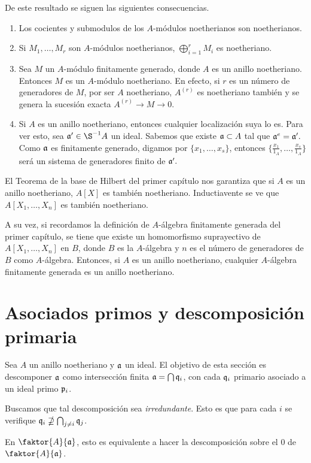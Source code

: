 \documentclass[../main.tex]{subfiles}
\begin{document}
\begin{remark}
De este resultado se siguen las siguientes consecuencias.\begin{enumerate}
    \item Los cocientes y submodulos de los $A$-módulos noetherianos son noetherianos.
    \item Si $M_1,\dots,M_r$ son $A$-módulos noetherianos, $\bigoplus_{i=1}^rM_i$ es noetheriano.
    \item Sea $M$ un $A$-módulo finitamente generado, donde $A$ es un anillo noetheriano. Entonces $M$ es un $A$-módulo noetheriano. En efecto, si $r$ es un número de generadores de $M$, por ser $A$ noetheriano, $A^{(r)}$ es noetheriano también y se genera la sucesión exacta $A^{(r)}\rightarrow M\rightarrow 0$.
    \item Si $A$ es un anillo noetheriano, entonces cualquier localización suya lo es. Para ver esto, sea $\af'\in\S^{-1}A$ un ideal. Sabemos que existe $\mathfrak{a}\subset A$ tal que $\mathfrak{a}^e=\mathfrak{a}'.$ Como $\mathfrak{a}$ es finitamente generado, digamos por $\{x_1,\dots,x_s\}$, entonces $\{\frac{x_1}{1_A},\dots,\frac{x_s}{1_A}\}$ será un sistema de generadores finito de $\mathfrak{a}'.$
\end{enumerate}
\end{remark}
El Teorema de la base de Hilbert del primer capítulo nos garantiza que si $A$ es un anillo noetheriano, $A[X]$ es también noetheriano. Inductiavente se ve que $A[X_1,\dots,X_n]$ es también noetheriano.

A su vez, si recordamos la definición de $A$-álgebra finitamente generada del primer capítulo, se tiene que existe un homomorfismo suprayectivo de $A[X_1,\dots,X_n]$ en $B$, donde $B$ es la $A$-álgebra y $n$ es el número de generadores de $B$ como $A$-álgebra. Entonces, si $A$ es un anillo noetheriano, cualquier $A$-álgebra finitamente generada es un anillo noetheriano.

\section{Asociados primos y descomposición primaria}
Sea $A$ un anillo noetheriano y $\mathfrak{a}$ un ideal. El objetivo de esta sección es descomponer $\mathfrak{a}$ como intersección finita $\mathfrak{a}=\bigcap \mathfrak{q}_i$, con cada $\mathfrak{q}_i$ primario asociado a un ideal primo $\mathfrak{p}_i$.

Buscamos que tal descomposición sea \textit{irredundante}. Esto es que para cada $i$ se verifique $\mathfrak{q}_i\nsupseteq \bigcap_{j\neq i}\mathfrak{q}_j$.

En $\faktor{A}{\af}$, esto es equivalente a hacer la descomposición sobre el $0$ de $\faktor{A}{\af}$.
\end{document}
